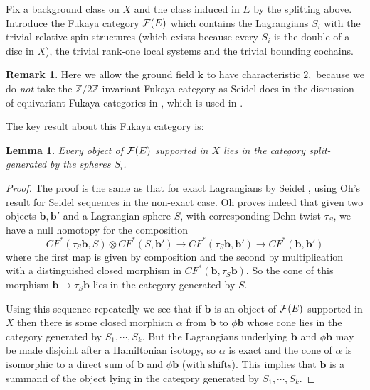 \documentclass{article}
\theoremstyle{plain}%
\newtheorem{lem}[thm]{Lemma}
\theoremstyle{definition}
\newtheorem{rem}[thm]{Remark}
\numberwithin{equation}{section}
\numberwithin{figure}{section}
\def\cF{{\mathbin{\cal F}}}
\def\Z{{\mathbin{\mathbb Z}}}
\def\al{\alpha}
\def\ph{\phi}
\def\ot{\otimes}
\def\k{{\mathbf{k}}}\def\b{{\mathbf{b}}}\def\x{{\mathbf{x}}}
\begin{document}
Fix a background class on $X$ and the class induced in $E$ by the splitting above. Introduce the Fukaya category $\cF(E)$ which contains the Lagrangians $S_i$ 
with the trivial relative spin structures (which exists because every $S_i$ is the double of a disc in $X$), the trivial rank-one local systems and the trivial bounding cochains.
\begin{rem}
Here we allow the ground field $\k$ to have characteristic $2,$ because we do {\it not} take the $\Z/2\Z$ invariant Fukaya category as Seidel does in the discussion of equivariant Fukaya categories in \cite{Seid3}, which is used in  \cite{FSS1}.
\end{rem}
The key result about this Fukaya category is:
\begin{lem} \label{lem:split_generation_double_cover}
  Every object of $\cF(E)$ supported in $X$ lies in the category split-generated by the spheres $S_i$.
\end{lem}
\begin{proof}
  The proof is the same as that for exact Lagrangians by Seidel \cite[Proposition 18.17]{Seid3}, using  Oh's result \cite[Section 9]{Oh} for Seidel sequences in the non-exact case.  Oh proves indeed that given two objects $\b,\b'$ and a Lagrangian sphere $S$, with corresponding Dehn twist $\tau_S$, we have a null homotopy for the composition
  \begin{equation}
    CF^*(\tau_S \b,S) \ot CF^*(S, \b')  \to   CF^*(\tau_S \b, \b')  \to   CF^*(\b,\b')
\end{equation}
where the first map is given by composition and the second by multiplication with a distinguished closed morphism in $  CF^*(\b,\tau_S \b)$. So the cone of this morphism $ \b \to \tau_S \b$  lies in the category generated by $S$.

Using this sequence repeatedly we see that if $\b$ is an object of $\cF(E)$ supported in $X$ then there is some closed morphism $\al$ from $\b$ to $\phi \b$ whose cone lies in the category generated by $S_1,\cdots, S_k.$
But the Lagrangians underlying $\b$ and $\ph\b$ may be made disjoint after a Hamiltonian isotopy,
so $\al$ is exact and the cone of $\al$ is isomorphic to a direct sum of $\b$ and $\ph\b$ (with shifts).
This implies that $\b$ is a summand of the object lying in the category generated by $S_1,\cdots, S_k$.
\end{proof}
\end{document}
